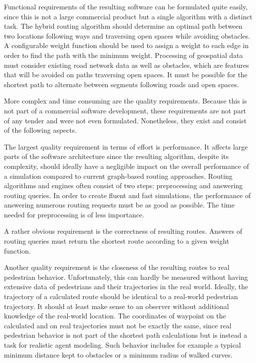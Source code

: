 		Functional requirements of the resulting software can be formulated quite easily, since this is not a large commercial product but a single algorithm with a distinct task.
		The hybrid routing algorithm should determine an optimal path between two locations following ways and traversing open spaces while avoiding obstacles.
		A configurable weight function should be used to assign a weight to each edge in order to find the path with the minimum weight.
		Processing of geospatial data must consider existing road network data as well as obstacles, which are features that will be avoided on paths traversing open spaces.
		It must be possible for the shortest path to alternate between segments following roads and open spaces.
		
		More complex and time consuming are the quality requirements.
		Because this is not part of a commercial software development, these requirements are not part of any tender and were not even formulated.
		Nonetheless, they exist and consist of the following aspects.
	
		The largest quality requirement in terms of effort is performance.
		It affects large parts of the software architecture since the resulting algorithm, despite its complexity, should ideally have a negligible impact on the overall performance of a simulation compared to current graph-based routing approaches.
		Routing algorithms and engines often consist of two steps: preprocessing and answering routing queries.
		In order to create fluent and fast simulations, the performance of answering numerous routing requests must be as good as possible.
		The time needed for preprocessing is of less importance.
		
		A rather obvious requirement is the correctness of resulting routes.
		Answers of routing queries must return the shortest route according to a given weight function.
		
		Another quality requirement is the closeness of the resulting routes to real pedestrian behavior.
		Unfortunately, this can hardly be measured without having extensive data of pedestrians and their trajectories in the real world.
		Ideally, the trajectory of a calculated route should be identical to a real-world pedestrian trajectory.
		It should at least make sense to an observer without additional knowledge of the real-world location.
		The coordinates of waypoint on the calculated and on real trajectories must not be exactly the same, since real pedestrian behavior is not part of the shortest path calculations but is instead a task for realistic agent modeling.
		Such behavior includes for example a typical minimum distance kept to obstacles or a minimum radius of walked curves.

